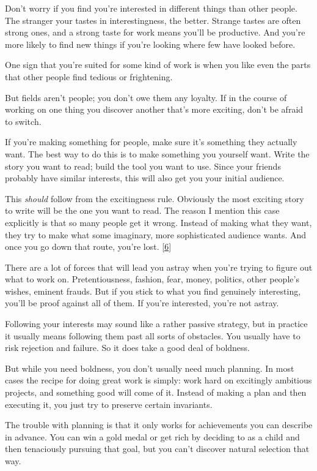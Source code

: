 Don't worry if you find you're interested in different things than other
people. The stranger your tastes in interestingness, the better. Strange
tastes are often strong ones, and a strong taste for work means you'll
be productive. And you're more likely to find new things if you're
looking where few have looked before.

One sign that you're suited for some kind of work is when you like even
the parts that other people find tedious or frightening.

But fields aren't people; you don't owe them any loyalty. If in the
course of working on one thing you discover another that's more
exciting, don't be afraid to switch.

If you're making something for people, make sure it's something they
actually want. The best way to do this is to make something you yourself
want. Write the story you want to read; build the tool you want to use.
Since your friends probably have similar interests, this will also get
you your initial audience.

This \emph{should} follow from the excitingness rule. Obviously the most
exciting story to write will be the one you want to read. The reason I
mention this case explicitly is that so many people get it wrong.
Instead of making what they want, they try to make what some imaginary,
more sophisticated audience wants. And once you go down that route,
you're lost. {[}\hyperref[f6n]{6}{]}

There are a lot of forces that will lead you astray when you're trying
to figure out what to work on. Pretentiousness, fashion, fear, money,
politics, other people's wishes, eminent frauds. But if you stick to
what you find genuinely interesting, you'll be proof against all of
them. If you're interested, you're not astray.

Following your interests may sound like a rather passive strategy, but
in practice it usually means following them past all sorts of obstacles.
You usually have to risk rejection and failure. So it does take a good
deal of boldness.

But while you need boldness, you don't usually need much planning. In
most cases the recipe for doing great work is simply: work hard on
excitingly ambitious projects, and something good will come of it.
Instead of making a plan and then executing it, you just try to preserve
certain invariants.

The trouble with planning is that it only works for achievements you can
describe in advance. You can win a gold medal or get rich by deciding to
as a child and then tenaciously pursuing that goal, but you can't
discover natural selection that way.

